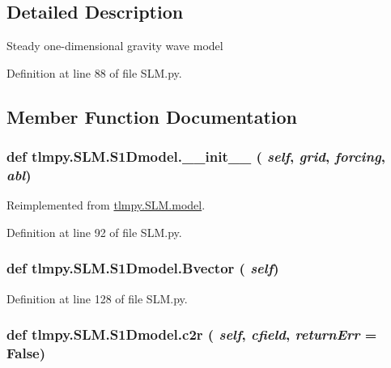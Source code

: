 \subsection{Detailed Description}
\begin{DoxyVerb}
Steady one-dimensional gravity wave model
\end{DoxyVerb}
 

Definition at line 88 of file SLM.py.

\subsection{Member Function Documentation}
\hypertarget{classtlmpy_1_1SLM_1_1S1Dmodel_ae74afc88fbe7090f8c6aadc5d2330687}{
\subsubsection[{\_\-\_\-init\_\-\_\-}]{\setlength{\rightskip}{0pt plus 5cm}def tlmpy.SLM.S1Dmodel.\_\-\_\-init\_\-\_\- ( {\em self}, \/   {\em grid}, \/   {\em forcing}, \/   {\em abl})}}
\label{classtlmpy_1_1SLM_1_1S1Dmodel_ae74afc88fbe7090f8c6aadc5d2330687}


Reimplemented from \hyperlink{classtlmpy_1_1SLM_1_1model_a9dda82ee48e8fd17f9fe6d1ae8d96e2d}{tlmpy.SLM.model}.

Definition at line 92 of file SLM.py.\hypertarget{classtlmpy_1_1SLM_1_1S1Dmodel_af9a3b3a79da2256f97bb20b3bb87eed9}{
\subsubsection[{Bvector}]{\setlength{\rightskip}{0pt plus 5cm}def tlmpy.SLM.S1Dmodel.Bvector ( {\em self})}}
\label{classtlmpy_1_1SLM_1_1S1Dmodel_af9a3b3a79da2256f97bb20b3bb87eed9}


Definition at line 128 of file SLM.py.\hypertarget{classtlmpy_1_1SLM_1_1S1Dmodel_afdf26cae657e01d807c6597f28b356e2}{
\subsubsection[{c2r}]{\setlength{\rightskip}{0pt plus 5cm}def tlmpy.SLM.S1Dmodel.c2r ( {\em self}, \/   {\em cfield}, \/   {\em returnErr} = {\ttfamily False})}}
\label{classtlmpy_1_1SLM_1_1S1Dmodel_afdf26cae657e01d807c6597f28b356e2}


